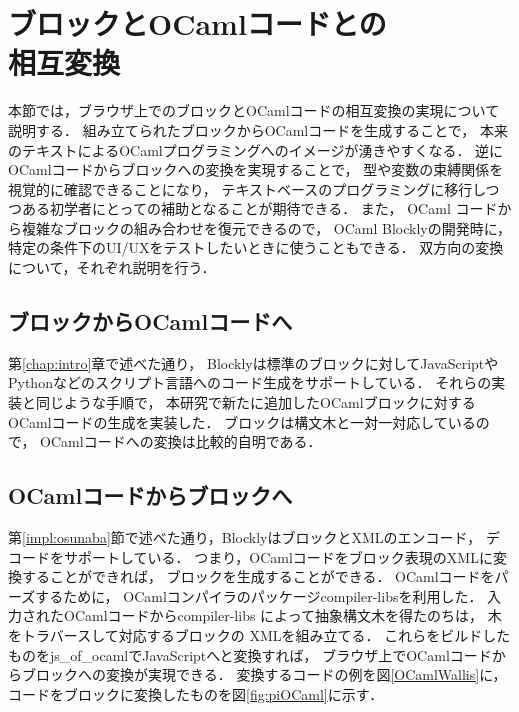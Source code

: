 \chapter[ブロックとOCamlコードとの相互変換]{ブロックとOCamlコードとの\\相互変換}\label{chap:converter}


本節では，ブラウザ上でのブロックとOCamlコードの相互変換の実現について説明する．
組み立てられたブロックからOCamlコードを生成することで，
本来のテキストによるOCamlプログラミングへのイメージが湧きやすくなる．
逆にOCamlコードからブロックへの変換を実現することで，
型や変数の束縛関係を視覚的に確認できることになり，
テキストベースのプログラミングに移行しつつある初学者にとっての補助となることが期待できる．
また， OCaml コードから複雑なブロックの組み合わせを復元できるので，
OCaml Blocklyの開発時に，
特定の条件下のUI/UXをテストしたいときに使うこともできる．
双方向の変換について，それぞれ説明を行う．

\section {ブロックからOCamlコードへ}
第\ref{chap:intro}章で述べた通り，
Blocklyは標準のブロックに対してJavaScriptやPythonなどのスクリプト言語へのコード生成をサポートしている．
それらの実装と同じような手順で，
本研究で新たに追加したOCamlブロックに対するOCamlコードの生成を実装した．
ブロックは構文木と一対一対応しているので，
OCamlコードへの変換は比較的自明である．
\section {OCamlコードからブロックへ}
第\ref{impl:osunaba}節で述べた通り，BlocklyはブロックとXMLのエンコード，
デコードをサポートしている．
つまり，OCamlコードをブロック表現のXMLに変換することができれば，
ブロックを生成することができる．
OCamlコードをパーズするために，
OCamlコンパイラのパッケージcompiler-libsを利用した．
入力されたOCamlコードからcompiler-libs によって抽象構文木を得たのちは，
木をトラバースして対応するブロックの XMLを組み立てる．
これらをビルドしたものをjs\_of\_ocamlでJavaScriptへと変換すれば，
ブラウザ上でOCamlコードからブロックへの変換が実現できる．
変換するコードの例を図\ref{OCamlWallis}に，
コードをブロックに変換したものを図\ref{fig:piOCaml}に示す．

